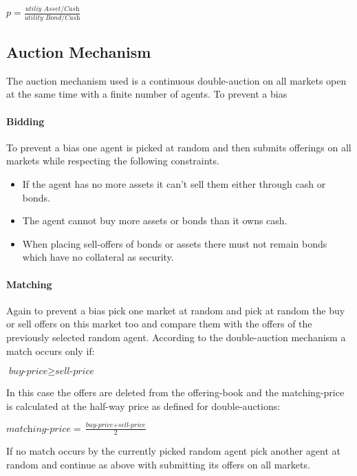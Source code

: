 \documentclass[../Bachelorarbeit.tex]{subfiles}
\begin{document}
\begin{center}
$p = \frac{\textit{utiliy Asset/Cash}}{\textit{utility Bond/Cash}}$
\end{center}

\subsection{Auction Mechanism}
The auction mechanism used is a continuous double-auction on all markets open at the same time with a finite number of agents. To prevent a bias

\paragraph{Bidding}
To prevent a bias one agent is picked at random and then submits offerings on all markets while respecting the following constraints.

\begin{itemize}
\item If the agent has no more assets it can't sell them either through cash or bonds.
\item The agent cannot buy more assets or bonds than it owns cash.
\item When placing sell-offers of bonds or assets there must not remain bonds which have no collateral as security. 
\end{itemize}

\paragraph{Matching}
Again to prevent a bias pick one market at random and pick at random the buy or sell offers on this market too and compare them with the offers of the previously selected random agent. According to the double-auction mechanism a match occurs only if:

\begin{center}
$\textit{buy-price} \geq \textit{sell-price}$
\end{center}

In this case the offers are deleted from the offering-book and the matching-price is calculated at the half-way price as defined for double-auctions:
\begin{center}
$\textit{matching-price} = \frac{\textit{buy-price} + \textit{sell-price}}{2}$
\end{center}

If no match occurs by the currently picked random agent pick another agent at random and continue as above with submitting its offers on all markets.
\end{document}

